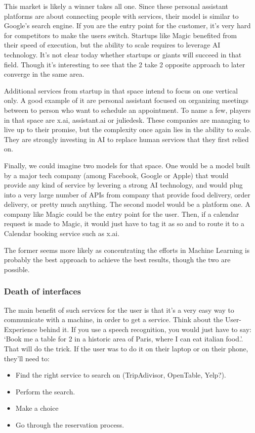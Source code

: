 \documentclass[12pt]{article}
\begin{document}
This market is likely a winner takes all one. Since these personal assistant
platforms are about connecting people with services, their model is similar to
Google's search engine. If you are the entry point for the customer, it's very
hard for competitors to make the users switch. Startups like Magic benefited
from their speed of execution, but the ability to scale requires to leverage AI
technology. It's not clear today whether startups or giants will succeed in that
field. Though it's interesting to see that the 2 take 2 opposite approach to
later converge in the same area.

Additional services from startup in that space intend to focus on one vertical
only. A good example of it are personal assistant focused on organizing meetings
between to person who want to schedule an appointment. To name a few, players in
that space are x.ai, assistant.ai or juliedesk. These companies are managing to
live up to their promise, but the complexity once again lies in the ability to
scale. They are strongly investing in AI to replace human services that they
first relied on.

Finally, we could imagine two models for that space.
One would be a model built by a major tech company (among Facebook, Google or
Apple) that would provide any kind of service by levering a strong AI
technology, and would plug into a very large number of APIs from company that
provide food delivery, order delivery, or pretty much anything.
The second model would be a platform one. A company like Magic could be the
entry point for the user. Then, if a calendar request is made to Magic, it would
just have to tag it as so and to route it to a Calendar booking service such as
x.ai.

The former seems more likely as concentrating the efforts in Machine Learning is
probably the best approach to achieve the best results, though the two are
possible.

\subsubsection{Death of interfaces}

The main benefit of such services for the user is that it's a very easy way to
communicate with a machine, in order to get a service. Think about the
User-Experience behind it. If you use a speech recognition, you would just
have to say: \lq Book me a table for 2 in a historic area of Paris, where I
can eat italian
food.\rq. That will do the trick.
If the user was to do it on their laptop or on their phone, they'll need to:
\begin{itemize}
  \item Find the right service to search on (TripAdivisor, OpenTable, Yelp?).
  \item Perform the search.
  \item Make a choice
  \item Go through the reservation process.
\end{itemize}
\end{document}
